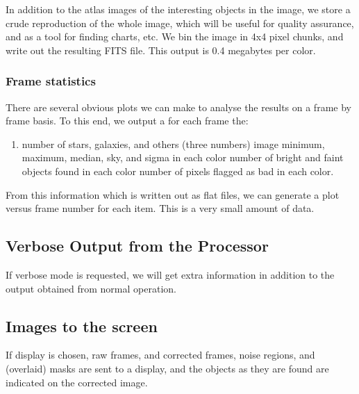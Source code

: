 In addition to the atlas images of the interesting objects in the image,
we store a crude reproduction of the whole image, which will
be useful for quality assurance, and as a tool for finding charts, etc.
We bin the image in 4x4 pixel chunks, and write out the resulting FITS
file.  This output is 0.4 megabytes per color.

\subsubsection{Frame statistics}

	There are several obvious plots we can make to analyse the
results on a frame by frame basis.  To this end, we output a for each frame
the:
\begin{enumerate}
\item number of stars, galaxies, and others (three numbers)
\sitem image minimum, maximum, median, sky, and sigma in each color
\sitem number of bright and faint objects found in each color
\sitem number of pixels flagged as bad in each color.
\end{enumerate}
From this information which is written out as flat files, we can generate
a plot versus frame number for each item.  This is a very small amount of
data.

\subsection{Verbose Output from the Processor}

	If verbose mode is requested, we will get extra information
in addition to the output obtained from normal operation.

\subsection{Images to the screen}

	If display is chosen, raw frames, and corrected frames, 
noise regions, and (overlaid) 
masks are sent to a display, and the objects as they are found are indicated
on the corrected image.
